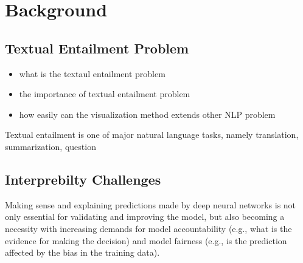 \section{Background}

\subsection{Textual Entailment Problem}

\begin{itemize}
    \item what is the textaul entailment problem
    \item the importance of textual entailment problem
    \item how easily can the visualization method extends other NLP problem
\end{itemize}

Textual entailment is one of major natural language tasks, namely translation,
summarization, question

\subsection{Interprebilty Challenges}
Making sense and explaining predictions made by deep neural networks is not only essential for validating and improving the model, but also becoming a necessity with increasing demands for model accountability (e.g., what is the evidence for making the decision) and model fairness (e.g., is the prediction affected by the bias in the training data).

